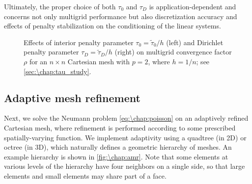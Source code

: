 Ultimately, the proper choice of both $\tau_0$ and $\tau_D$ is application-dependent and concerns not only multigrid performance but also discretization accuracy and effects of penalty stabilization on the conditioning of the linear systems.

\begin{figure}[!t]
  \centering
  \hspace*{0.8cm}
  \begin{minipage}{0.49\textwidth}
  \footnotesize
  \end{minipage}%
  \begin{minipage}{0.49\textwidth}
  \footnotesize
  \end{minipage}%
  \caption{Effects of interior penalty parameter $\tau_0 = \widetilde{\tau}_0/h$ (left) and Dirichlet penalty parameter $\tau_D = \widetilde{\tau}_D/h$ (right) on multigrid convergence factor $\rho$ for an $n \times n$ Cartesian mesh with $p=2$, where $h = 1/n$; see \cref{sec:\chap:tau_study}.}
  \label{fig:\chap:tau_study}
\end{figure}

\subsection{Adaptive mesh refinement}\label{sec:\chap:amr}
Next, we solve the Neumann problem \cref{eq:\chap:poisson} on an adaptively refined Cartesian mesh, where refinement is performed according to some prescribed spatially-varying function. We implement adaptivity using a quadtree (in 2D) or octree (in 3D), which naturally defines a geometric hierarchy of meshes. An example hierarchy is shown in \cref{fig:\chap:amr}. Note that some elements at various levels of the hierarchy have four neighbors on a single side, so that large elements and small elements may share part of a face.

